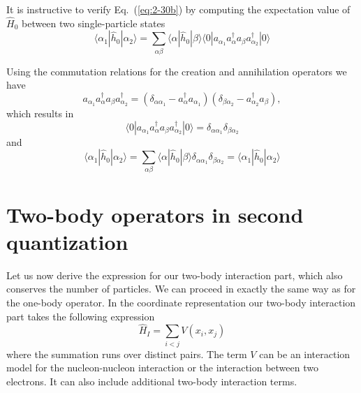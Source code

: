 \documentclass[graybox,sectrefs,envcountresetchap,open=right]{svmonodo}
\begin{document}
It is instructive to verify Eq.~(\ref{eq:2-30b}) by computing the expectation value of $\hat{H}_0$ 
between two single-particle states
\begin{equation}
	\langle \alpha_1|\hat{h}_0|\alpha_2\rangle = \sum_{\alpha\beta} \langle \alpha|\hat{h}_0|\beta\rangle
		\langle 0|a_{\alpha_1}a_\alpha^{\dagger} a_\beta a_{\alpha_2}^{\dagger}|0\rangle \label{eq:2-30c}
\end{equation}





Using the commutation relations for the creation and annihilation operators we have 
\begin{equation}
a_{\alpha_1}a_\alpha^{\dagger} a_\beta a_{\alpha_2}^{\dagger} = (\delta_{\alpha \alpha_1} - a_\alpha^{\dagger} a_{\alpha_1} )(\delta_{\beta \alpha_2} - a_{\alpha_2}^{\dagger} a_{\beta} ), \label{eq:2-30d}
\end{equation}
which results in
\begin{equation}
\langle 0|a_{\alpha_1}a_\alpha^{\dagger} a_\beta a_{\alpha_2}^{\dagger}|0\rangle = \delta_{\alpha \alpha_1} \delta_{\beta \alpha_2} \label{eq:2-30e}
\end{equation}
and
\begin{equation}
\langle \alpha_1|\hat{h}_0|\alpha_2\rangle = \sum_{\alpha\beta} \langle \alpha|\hat{h}_0|\beta\rangle\delta_{\alpha \alpha_1} \delta_{\beta \alpha_2} = \langle \alpha_1|\hat{h}_0|\alpha_2\rangle \label{eq:2-30f}
\end{equation}



\section{Two-body operators in second quantization}

Let us now derive the expression for our two-body interaction part, which also conserves the number of particles.
We can proceed in exactly the same way as for the one-body operator. In the coordinate representation our
two-body interaction part takes the following expression
\begin{equation}
	\hat{H}_I = \sum_{i < j} V(x_i,x_j) \label{eq:2-31}
\end{equation}
where the summation runs over distinct pairs. The term $V$ can be an interaction model for the nucleon-nucleon interaction
or the interaction between two electrons. It can also include additional two-body interaction terms. 
\end{document}
